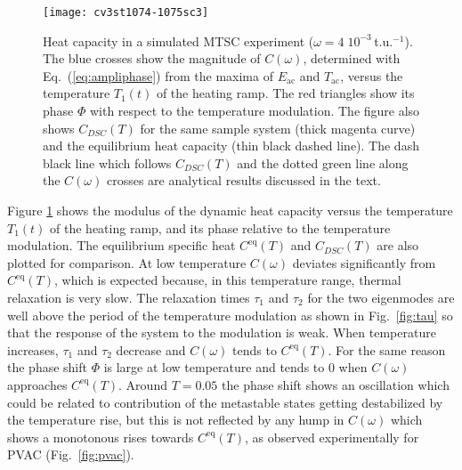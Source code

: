 \documentclass[pre,a4paper,twocolumn,superscriptaddress,%
floatfix]{revtex4}
\newcommand{\tac}{\ensuremath{T_{\mathrm{ac}}}}
\begin{document}
\begin{figure}[h]
  \centering
  \texttt{[image: cv3st1074-1075sc3]}
  \caption{Heat capacity in a simulated MTSC experiment
    ($\omega = 4\;10^{-3}\,$t.u.$^{-1}$). The blue crosses show
    the magnitude of $C(\omega)$, determined with Eq.~(\ref{eq:ampliphase})
    from the maxima of $E_{\mathrm{ac}}$ and
    $\tac$,  versus the temperature $T_1(t)$ of the heating ramp. The
    red triangles
  show its phase $\Phi$ with respect to the temperature modulation. The figure
also shows $C_{DSC}(T)$ for the same sample system (thick magenta curve) and
the equilibrium heat capacity (thin black dashed line). The dash black
line which
follows  $C_{DSC}(T)$ and the dotted green line
along the $C(\omega)$ crosses are
analytical results discussed in the text.}
  \label{fig:cv1}
\end{figure}

Figure \ref{fig:cv1} shows the modulus of the dynamic heat capacity versus the
temperature $T_1(t)$ of the heating ramp, and its phase relative to the
temperature modulation. The equilibrium specific heat $C^{\mathrm{eq}}(T)$ and
$C_{DSC}(T)$ are also plotted for comparison. At low temperature $C(\omega)$
deviates significantly from  $C^{\mathrm{eq}}(T)$, which is expected because,
in this temperature range, thermal relaxation is very slow. The relaxation
times $\tau_1$ and $\tau_2$ for the two eigenmodes are well above the period
of the temperature modulation as shown in Fig.~\ref{fig:tau} so that the
response of the system to the modulation is weak. When temperature increases,
$\tau_1$ and $\tau_2$ decrease and $C(\omega)$ tends to
$C^{\mathrm{eq}}(T)$. For the same reason the phase shift $\Phi$ is large at low
temperature and tends to $0$ when $C(\omega)$ approaches
$C^{\mathrm{eq}}(T)$. Around $T=0.05$ the phase shift shows an oscillation
which could be related to contribution of the metastable states getting
destabilized by the temperature rise, but this is not reflected by any hump in
$C(\omega)$ which shows a monotonous rises towards $C^{\mathrm{eq}}(T)$, as
observed experimentally for PVAC (Fig.~\ref{fig:pvac}).
\end{document}
